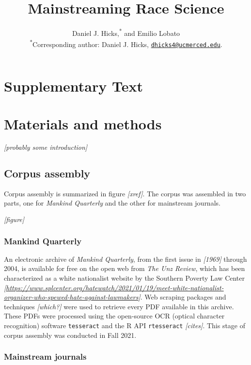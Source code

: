 \documentclass[12pt]{article}
\title{\bf Mainstreaming Race Science}
\author{
Daniel J. Hicks,\textsuperscript{*}
and Emilio Lobato
\\\textsuperscript{*}Corresponding author: Daniel J. Hicks,
\href{mailto:dhicks4@ucmerced.edu}{\nolinkurl{dhicks4@ucmerced.edu}}.
}
\date{}
\begin{document}
\maketitle
\section*{Supplementary Text}
\renewcommand{\thesection}{S\arabic{section}}
\hypertarget{materials-and-methods}{%
\section*{Materials and methods}\label{materials-and-methods}}

\emph{{[}probably some introduction{]}}

\hypertarget{corpus-assembly}{%
\subsection*{Corpus assembly}\label{corpus-assembly}}

Corpus assembly is summarized in figure \emph{{[}xref{]}}. The corpus
was assembled in two parts, one for \emph{Mankind Quarterly} and the
other for mainstream journals.

\emph{{[}figure{]}}

\hypertarget{mankind-quarterly}{%
\subsubsection*{Mankind Quarterly}\label{mankind-quarterly}}

An electronic archive of \emph{Mankind Quarterly}, from the first issue
in \emph{{[}1969{]}} through 2004, is available for free on the open web
from \emph{The Unz Review}, which has been characterized as a white
nationalist website by the Southern Poverty Law Center
\emph{{[}\url{https://www.splcenter.org/hatewatch/2021/01/19/meet-white-nationalist-organizer-who-spewed-hate-against-lawmakers}{]}}.
Web scraping packages and techniques \emph{{[}which?{]}} were used to
retrieve every PDF available in this archive. These PDFs were processed
using the open-source OCR (optical character recognition) software
\texttt{tesseract} and the R API \texttt{rtesseract} \emph{{[}cites{]}}.
This stage of corpus assembly was conducted in Fall 2021.

\hypertarget{mainstream-journals}{%
\subsubsection*{Mainstream journals}\label{mainstream-journals}}
\end{document}
